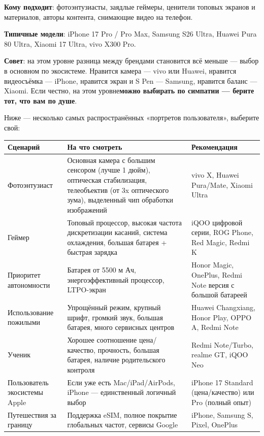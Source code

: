 
\textbf{Кому подходит}: фотоэнтузиасты, заядлые геймеры, ценители топовых экранов и материалов, авторы контента, снимающие видео на телефон.

\textbf{Типичные модели}: iPhone 17 Pro / Pro Max, Samsung S26 Ultra, Huawei Pura 80 Ultra, Xiaomi 17 Ultra, vivo X300 Pro.

\textbf{Совет}: на этом уровне разница между брендами становится всё меньше — выбор в основном по экосистеме. Нравится камера — vivo или Huawei, нравится видеосъёмка — iPhone, нравится экран и S Pen — Samsung, нравится баланс — Xiaomi. Если честно, на этом уровне\textbf{можно выбирать по симпатии — берите тот, что вам по душе}.


Ниже — несколько самых распространённых «портретов пользователя», выберите свой:

\begin{center}
\begin{tabularx}{\linewidth}{|X|X|X|}
\hline
\textbf{Сценарий} & \textbf{На что смотреть} & \textbf{Рекомендация} \tabularnewline
\hline
Фотоэнтузиаст & Основная камера с большим сенсором (лучше 1 дюйм), оптическая стабилизация, телеобъектив (от 3x оптического зума), выделенный чип обработки изображений & vivo X, Huawei Pura/Mate, Xiaomi Ultra \tabularnewline
Геймер & Топовый процессор, высокая частота дискретизации касаний, система охлаждения, большая батарея + быстрая зарядка & iQOO цифровой серии, ROG Phone, Red Magic, Redmi K \tabularnewline
Приоритет автономности & Батарея от 5500 м Ач, энергоэффективный процессор, LTPO-экран & Honor Magic, OnePlus, Redmi Note версия с большой батареей \tabularnewline
Использование пожилыми & Упрощённый режим, крупный шрифт, громкий звук, большая батарея, много сервисных центров & Huawei Changxiang, Honor Play, OPPO A, Redmi Note \tabularnewline
Ученик & Хорошее соотношение цена/качество, прочность, большая батарея, наличие родительского контроля & Redmi Note/Turbo, realme GT, iQOO Neo \tabularnewline
Пользователь экосистемы Apple & Если уже есть Mac/iPad/AirPods, iPhone — единственный логичный выбор & iPhone 17 Standard (цена/качество) или Pro (полный опыт) \tabularnewline
Путешествия за границу & Поддержка eSIM, полное покрытие глобальных частот, сервисы Google & iPhone, Samsung S, Pixel, OnePlus \tabularnewline
\hline
\end{tabularx}
\end{center}

